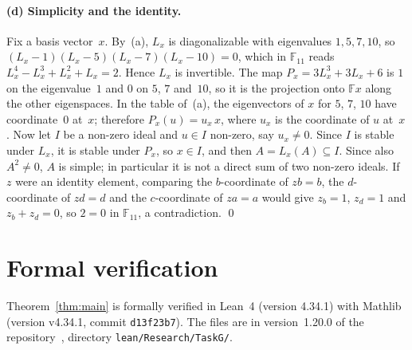 \documentclass[11pt]{article}
\theoremstyle{remark}
\newcommand{\repoversion}{1.20.0}
\newcommand{\F}{\mathbb{F}}
\begin{document}
\paragraph{(d) Simplicity and the identity.}
Fix a basis vector~$x$. By~(a), $L_x$ is diagonalizable with eigenvalues
$1,5,7,10$, so $(L_x-1)(L_x-5)(L_x-7)(L_x-10)=0$, which in $\F_{11}$ reads
$L_x^4-L_x^3+L_x^2+L_x=2$. Hence $L_x$ is invertible. The map
$P_x=3L_x^3+3L_x+6$ is $1$ on the eigenvalue~$1$ and $0$ on $5$, $7$ and~$10$,
so it is the projection onto $\F x$ along the other eigenspaces. In the table
of~(a), the eigenvectors of $x$ for $5$, $7$, $10$ have coordinate~$0$ at~$x$;
therefore $P_x(u)=u_x\,x$, where $u_x$ is the coordinate of $u$ at~$x$. Now
let $I$ be a non-zero ideal and $u\in I$ non-zero, say $u_x\ne0$. Since $I$ is
stable under $L_x$, it is stable under $P_x$, so $x\in I$, and then
$A=L_x(A)\subseteq I$. Since also $A^2\ne0$, $A$ is simple; in particular it
is not a direct sum of two non-zero ideals. If $z$ were an identity element, comparing the
$b$-coordinate of $zb=b$, the $d$-coordinate of $zd=d$ and the $c$-coordinate
of $za=a$ would give $z_b=1$, $z_d=1$ and $z_b+z_d=0$, so $2=0$ in $\F_{11}$, a
contradiction. \qed

\section{Formal verification}\label{sec:lean}

Theorem~\ref{thm:main} is formally verified in Lean~4 (version 4.34.1) with
Mathlib~\cite{mathlib} (version v4.34.1, commit \texttt{d13f23b7}). The files
are in version~\repoversion{} of the repository~\cite{repo}, directory
\texttt{lean/\allowbreak Research/\allowbreak TaskG/}.
\end{document}
